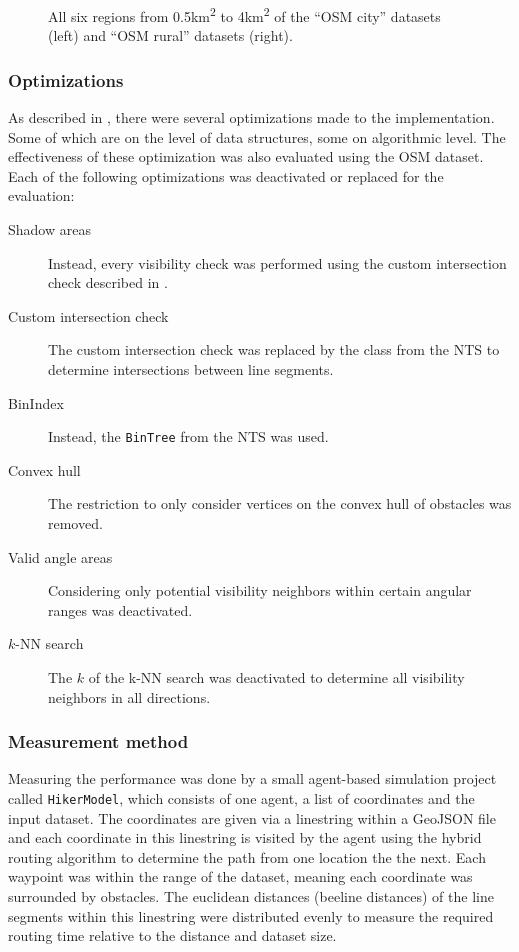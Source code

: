 \begin{figure}[h!]
\begin{minipage}[t]{.38\textwidth}
\begin{figcenter}
					\end{figcenter}
				\end{minipage}
				\caption{All six regions from 0.5km\textsuperscript{2} to 4km\textsuperscript{2} of the \enquote{OSM city} datasets (left) and \enquote{OSM rural} datasets (right).}
			\end{figure}
		
		\subsubsection{Optimizations}
		
			As described in , there were several optimizations made to the implementation.
			Some of which are on the level of data structures, some on algorithmic level.
			The effectiveness of these optimization was also evaluated using the OSM dataset.
			Each of the following optimizations was deactivated or replaced for the evaluation:

			\begin{description}
				\item[Shadow areas] Instead, every visibility check was performed using the custom intersection check described in .
				\item[Custom intersection check] The custom intersection check was replaced by the  class from the NTS to determine intersections between line segments.
				\item[BinIndex] Instead, the \texttt{BinTree} from the NTS was used.
				\item[Convex hull] The restriction to only consider vertices on the convex hull of obstacles was removed.
				\item[Valid angle areas] Considering only potential visibility neighbors within certain angular ranges was deactivated.
				\item[$k$-NN search] The $k$ of the k-NN search was deactivated to determine all visibility neighbors in all directions.
			\end{description}		
			
		\subsubsection{Measurement method}
		
			Measuring the performance was done by a small agent-based simulation project called \texttt{HikerModel}, which consists of one agent, a list of coordinates and the input dataset.
			The coordinates are given via a linestring within a GeoJSON file and each coordinate in this linestring is visited by the agent using the hybrid routing algorithm to determine the path from one location the the next.
			Each waypoint was within the range of the dataset, meaning each coordinate was surrounded by obstacles.
			The euclidean distances (beeline distances) of the line segments within this linestring were distributed evenly to measure the required routing time relative to the distance and dataset size.
			
